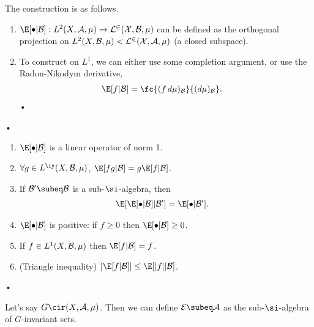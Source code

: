 The construction is as follows. 
\begin{enumerate}
\item
$\E[\bullet | \cal B]: L^2(X,\cal A, \mu) \to L^2(X,\cal B, \mu)$  can be defined as the orthogonal projection on $L^2(X,\cal B, \mu)<L^2(X, \cal A, \mu)$ (a closed subspace).
\item
To construct on $L^1$, we can either use some completion argument, or use the Radon-Nikodym derivative,
\begin{align}
\E [f|\cal B] &= \fc{(f\,d\mu)_{\cal B}}{(d\mu)_{\cal B}}.
\end{align}•
\end{enumerate}•
\begin{pr}
\begin{enumerate}
\item
$\E[\bullet|\cal B]$ is a linear operator of norm 1.
\item
$\forall g\in L^\iy(X, \cal B,\mu)$, $\E[fg|\cal B] = g\E[f|\cal B]$. 
\item
If $\cal B'\subeq \cal B$ is a sub-$\si$-algebra, then 
\begin{align}
\E[\E[\bullet |\cal B]|\cal B']&= \E[\bullet |\cal B'].
\end{align}
\item
$\E[\bullet |\cal B]$ is positive: if $f\ge 0$ then $\E[\bullet |\cal B]\ge 0$. 
\item
If $f\in L^1(X,\cal B,\mu)$ then $\E[f|\cal B]=f$.
\item
(Triangle inequality)
$|\E[f|\cal B]|\le \E[|f||\cal B]$.
\end{enumerate}•
\end{pr}

Let's say $G\cir (X,\cal A, \mu)$. Then we can define $\cal E\subeq \cal A$ as the sub-$\si$-algebra of $G$-invariant sets. 

\newcommand{\ewrt}[1]{\stackrel{#1}{\equiv}}

